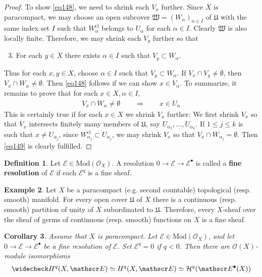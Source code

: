 \documentclass[12pt,b5paper,notitlepage]{report}
\theoremstyle{definition}
\newtheorem{df}{Definition}[section]
\newtheorem{eg}[df]{Example}
\theoremstyle{plain}
\newtheorem{co}[df]{Corollary}
\newcommand{\fk}{\mathfrak}
\newcommand{\mc}{\mathcal}
\newcommand{\wch}{\widecheck}
\newcommand{\scr}{\mathscr}
\newcommand{\blt}{\bullet}
\newcommand{\cl}{\mathrm{cl}}
\newcommand{\Mod}{\mathrm{Mod}}
\numberwithin{equation}{section}
\begin{document}
\begin{proof}
To show \eqref{eq148}, we need to shrink each $V_x$ further. Since $X$ is paracompact, we may choose an open subcover $\fk W=(W_\alpha)_{\alpha\in I}$ of $\fk U$ with the same index set $I$ such that $W_\alpha^\cl$ belongs to $U_\alpha$ for each $\alpha\in I$. Clearly $\fk W$ is also locally finite. Therefore, we may shrink each $V_y$ further so that
\begin{enumerate}[label=(\alph*)] \setcounter{enumi}{2}
\item For each $y\in X$ there exists $\alpha\in I$ such that $V_y\subset W_\alpha$.
\end{enumerate}
Thus for each $x,y\in X$, choose $\alpha\in I$ such that $V_y\subset W_\alpha$. If $V_x\cap V_y\neq\emptyset$, then $V_x\cap W_\alpha\neq\emptyset$. Then \eqref{eq148} follows if we can show $x\in V_\alpha$. To summarize, it remains to prove that for each $x\in X,\alpha\in I$,
\begin{align}
V_x\cap W_\alpha\neq\emptyset\qquad\Longrightarrow \qquad x\in U_\alpha \label{eq149}
\end{align}
This is certainly true if for each $x\in X$ we shrink $V_x$ further: We first shrink $V_x$ so that $V_x$ intersects finitely many members of $\fk U$, say $U_{\alpha_1},\dots,U_{\alpha_k}$. If $1\leq j\leq k$ is such that $x\neq U_{\alpha_j}$, since $W_{\alpha_j}^\cl\subset U_{\alpha_j}$, we may shrink $V_x$ so that $V_x\cap W_{\alpha_j}=\emptyset$. Then \eqref{eq149} is clearly fulfilled.
\end{proof}



\begin{df}
Let $\scr E\in\Mod(\scr O_X)$. A resolution $0\rightarrow\scr E\rightarrow\scr E^\blt$ is called a \textbf{fine resolution}   of $\scr E$ if each $\scr E^q$ is a fine sheaf.
\end{df}


\begin{eg}\label{lb325}
Let $X$ be a paracompact (e.g. second countable)  topological (resp. smooth) manifold. For every open cover $\fk U$ of $X$ there is a continuous (resp. smooth) partition of unity of $X$ subordinated to $\fk U$. Therefore, every $X$-sheaf over the sheaf of germs of continuous (resp. smooth) functions on $X$ is a fine sheaf.
\end{eg}


\begin{co}\label{lb322}
Assume that $X$ is paracompact. Let $\scr E\in\Mod(\scr O_X)$, and let $0\rightarrow\scr E\rightarrow\scr E^\blt$ be a fine resolution of $\scr E$. Set $\scr E^q=0$ if $q<0$. Then there are $\scr O(X)$-module isomorphisms
\begin{align*}
\wch H^q(X,\scr E)\simeq H^q(X,\scr E)\simeq \mc H^q(\scr E^\blt(X))
\end{align*}
\end{co}
\end{document}
